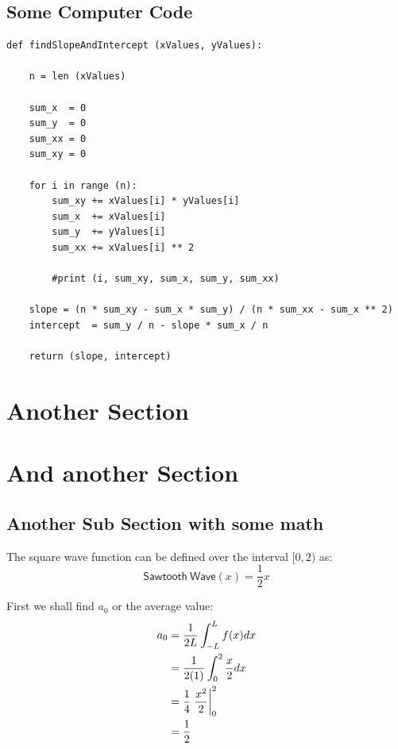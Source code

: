 \documentclass[11pt,letterpaper,twoside]{book}
\begin{document}
\lipsum[2]

\subsection{Some Computer Code}

\lipsum[20-21]

\begin{verbatim}
def findSlopeAndIntercept (xValues, yValues):

    n = len (xValues)

    sum_x  = 0
    sum_y  = 0
    sum_xx = 0
    sum_xy = 0

    for i in range (n):
        sum_xy += xValues[i] * yValues[i]
        sum_x  += xValues[i]
        sum_y  += yValues[i]
        sum_xx += xValues[i] ** 2

        #print (i, sum_xy, sum_x, sum_y, sum_xx)

    slope = (n * sum_xy - sum_x * sum_y) / (n * sum_xx - sum_x ** 2)
    intercept  = sum_y / n - slope * sum_x / n

    return (slope, intercept) 
\end{verbatim}

\lipsum[34]

\section{Another Section}

\lipsum[34-35]

\section{And another Section}

\lipsum[4-5]

\subsection{Another Sub Section with some math}

\lipsum[6-7]
The square wave function can be defined over the interval $[0, 2)$ as:
\[
\mathsf{Sawtooth\ Wave}(x) = \frac{1}{2} x 
\]

First we shall find $a_0$ or the average value:
\begin{align*}
a_0 &= \frac{1}{2L} \int_{-L}^L f(x) dx  \\
    &= \frac{1}{2(1)} \int_0^{2} \frac{x}{2} dx \\
    &= \frac{1}{4} \left. \frac{x^2}{2} \vphantom{\frac{1}{2}} \right|^2_0 \\
    &= \frac{1}{2}
\end{align*}
\end{document}
